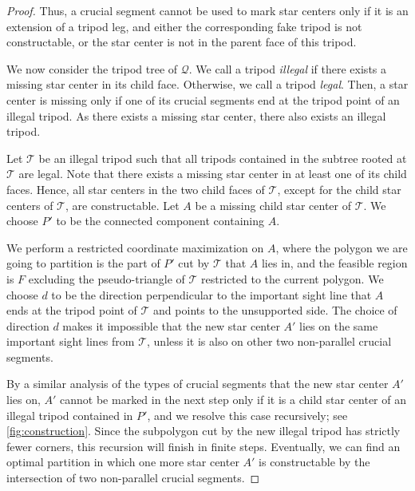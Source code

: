 \documentclass[10pt,a4paper]{article}
\begin{document}
\begin{proof}
Thus, a crucial segment cannot be used to mark star centers only if it is an extension of a tripod leg, and either the corresponding fake tripod is not constructable, or the star center is not in the parent face of this tripod. 

We now consider the tripod tree of $\mathcal{Q}$. 
We call a tripod \emph{illegal} if there exists a missing star center in its child face. 
Otherwise, we call a tripod \emph{legal}. 
Then, a star center is missing only if one of its crucial segments end at the tripod point of an illegal tripod. 
As there exists a missing star center, there also exists an illegal tripod. 

Let $\mathcal{T}$ be an illegal tripod such that all tripods contained in the subtree rooted at $\mathcal{T}$ are legal. 
Note that there exists a missing star center in at least one of its child faces. 
Hence, all star centers in the two child faces of $\mathcal{T}$, except for the child star centers of $\mathcal{T}$, are constructable. 
Let $A$ be a missing child star center of $\mathcal{T}$. 
We choose $P'$ to be the connected component containing $A$. 

We perform a restricted coordinate maximization on $A$, where the polygon we are going to partition is the part of $P'$ cut by $\mathcal{T}$ that $A$ lies in, and the feasible region is $F$ excluding the pseudo-triangle of $\mathcal{T}$ restricted to the current polygon. 
We choose $d$ to be the direction perpendicular to the important sight line that $A$ ends at the tripod point of $\mathcal{T}$ and points to the unsupported side. 
The choice of direction $d$ makes it impossible that the new star center $A'$ lies on the same important sight lines from $\mathcal{T}$, unless it is also on other two non-parallel crucial segments.

By a similar analysis of the types of crucial segments that the new star center $A'$ lies on, $A'$ cannot be marked in the next step only if it is a child star center of an illegal tripod contained in $P'$, and we resolve this case recursively; see \cref{fig:construction}. Since the subpolygon cut by the new illegal tripod has strictly fewer corners, this recursion will finish in finite steps. Eventually, we can find an optimal partition in which one more star center $A'$ is constructable by the intersection of two non-parallel crucial segments. 
\end{proof}
\end{document}
